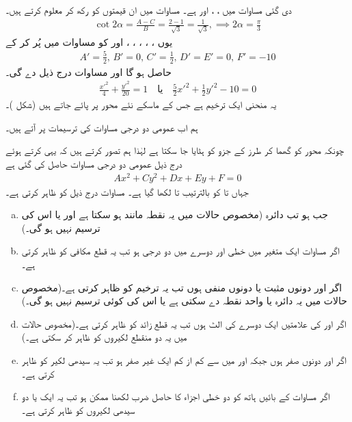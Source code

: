 دی گئی مساوات میں ، ،  اور  ہے۔ مساوات  میں ان قیمتوں کو رکھ کر   معلوم کرتے ہیں۔
\begin{align*}
\cot2\alpha=\frac{A-C}{B}=\frac{2-1}{\sqrt{3}}=\frac{1}{\sqrt{3}},\implies 2\alpha=\frac{\pi}{3}
\end{align*}
یوں ، ، ، ، ،  اور  کو مساوات  میں پُر کر کے
\begin{align*}
A'=\frac{5}{2},\, B'=0,\, C'=\frac{1}{2},\, D'=E'=0,\, F'=-10
\end{align*}
حاصل ہو گا  اور مساوات  درج ذیل دے گی۔
\begin{align*}
\frac{x'^2}{4}+\frac{y'^2}{20}=1\quad \text{یا}\quad \frac{5}{2}x'^2+\frac{1}{2}y'^2-10=0
\end{align*}
یہ منحنی ایک  ترخیم ہے جس کے ماسکے نئے      محور پر پائے جاتے ہیں (شکل )۔

ہم اب عمومی دو درجی مساوات کی ترسیمات پر آتے ہیں۔

چونکہ محور کو گھما کر  طرز کے جزو کو ہٹایا جا سکتا ہے لہٰذا ہم تصور کرتے ہیں کہ یہی کرتے ہوئے درج ذیل عمومی دو درجی مساوات حاصل کی گئی ہے
\begin{align}\label{مساوات_مخروط_عمومی_سادہ_دو_درجی_الف}
Ax^2+Cy^2+Dx+Ey+F=0
\end{align}
جہاں  تا  کو بالترتیب  تا  لکھا گیا ہے۔ مساوات  درج ذیل کو ظاہر کرتی ہے۔
\begin{enumerate}[a.]
\item
جب  ہو تب دائرہ (مخصوص حالات میں یہ نقطہ مانند ہو سکتا ہے اور یا  اس کی ترسیم نہیں ہو گی۔)
\item
اگر مساوات  ایک متغیر میں خطی اور دوسرے میں دو درجی ہو تب یہ قطع مکافی کو ظاہر کرتی ہے۔ 
\item
اگر  اور  دونوں مثبت یا دونوں منفی ہوں تب یہ ترخیم کو ظاہر کرتی ہے۔(مخصوص حالات میں یہ دائرہ یا واحد نقطہ دے سکتی ہے یا اس کی کوئی ترسیم نہیں ہو گی۔)
\item
اگر  اور  کی علامتیں ایک دوسرے کی الٹ ہوں تب یہ قطع زائد کو ظاہر کرتی ہے۔(مخصوص حالات میں یہ دو منقطع لکیروں کو ظاہر کر سکتی ہے۔)
\item
اگر اور  دونوں صفر ہوں جبکہ  اور  میں سے کم از کم ایک غیر صفر ہو تب یہ سیدھی لکیر کو ظاہر کرتی ہے۔
\item
اگر مساوات  کے بائیں ہاتھ کو دو خطی اجزاء کا حاصل ضرب لکھنا ممکن ہو تب یہ ایک یا دو سیدھی لکیروں کو ظاہر کرتی ہے۔
\end{enumerate}

